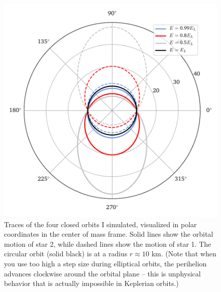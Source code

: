 \documentclass[11pt]{article}
\begin{document}
\begin{figure}[!h]
\centering
\includegraphics[scale=1]{keplerian_orbit/orbit_diagram.pdf}
\caption{\label{fig:trace} Traces of the four closed orbits I simulated, visualized in polar coordinates in the center of mass frame. Solid lines show the orbital motion of star 2, while dashed lines show the motion of star 1. The circular orbit (solid black) is at a radius $r \approx 10$ km. (Note that when you use too high a step size during elliptical orbits, the perihelion advances clockwise around the orbital plane -- this is unphysical behavior that is actually impossible in Keplerian orbits.)}
\end{figure}
\end{document}
